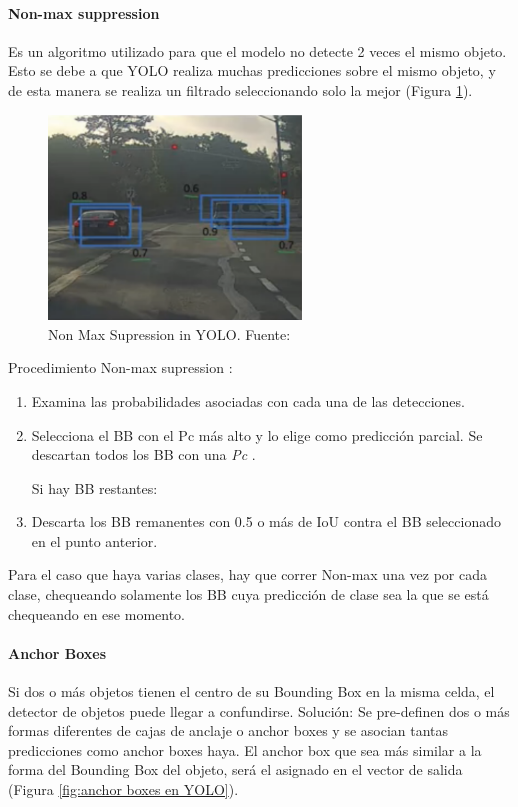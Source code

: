 \paragraph{Non-max suppression}
Es un algoritmo utilizado para que el modelo no detecte 2 veces el mismo objeto. Esto se debe a que YOLO realiza muchas predicciones sobre el mismo objeto, y de esta manera se realiza un filtrado seleccionando solo la mejor (Figura \ref{fig:non max supression}).
\\
\begin{figure}[h]
    \centering
    \includegraphics[width=0.6\textwidth]{img/non-max-supression-yolo.png}
    \caption{Non Max Supression in YOLO. Fuente:\cite{cnncourse}}
    \label{fig:non max supression}
\end{figure}

Procedimiento Non-max supression \cite{cnncourse} :
\begin{enumerate}
    \item Examina las probabilidades asociadas con cada una de las detecciones. 
    \item Selecciona el BB con el Pc más alto y lo elige como predicción parcial. Se descartan todos los BB con una \textit{Pc }.

Si hay BB restantes:
    \item Descarta los BB remanentes con 0.5 o más de IoU contra el BB seleccionado en el punto anterior.
\end{enumerate}
Para el caso que haya varias clases, hay que correr Non-max una vez por cada clase, chequeando solamente los BB cuya predicción de clase sea la que se está chequeando en ese momento.

\newpage
\paragraph{Anchor Boxes}
Si dos o más objetos tienen el centro de su Bounding Box en la misma celda, el detector de objetos puede llegar a confundirse. Solución: Se pre-definen dos o más formas diferentes de cajas de anclaje o anchor boxes y se asocian tantas predicciones como anchor boxes haya. El anchor box que sea más similar a la forma del Bounding Box del objeto, será el asignado en el vector de salida \cite{cnncourse} (Figura \ref{fig:anchor boxes en YOLO}).

